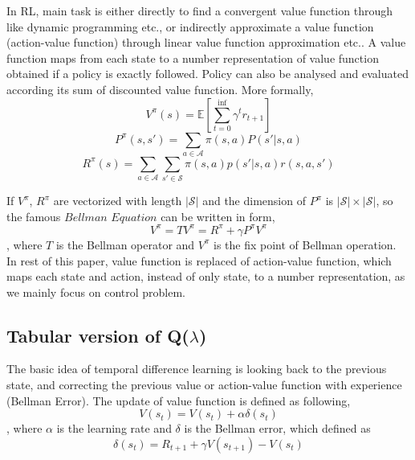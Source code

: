 \documentclass[conference]{IEEEtran}
\begin{document}
In RL, main task is either directly to find a convergent value function through like dynamic programming etc., or indirectly approximate a value function (action-value function) through linear value function approximation etc.. A value function maps from each state to a number representation of value function obtained if a policy is exactly followed. Policy can also be analysed and evaluated according its sum of discounted value function. More formally, 
\begin{equation}
V^{\pi}(s) = \mathbb{E}[\sum_{t=0}^{\inf}\gamma^{t}r_{t+1}]
\end{equation}
\begin{equation}
P^{\pi}(s, s') = \sum_{a\in\mathcal{A}}\pi(s, a)P(s'|s,a)
\end{equation}
\begin{equation}
R^{\pi}(s) = \sum_{a\in\mathcal{A}}\sum_{s'\in\mathcal{S}}\pi(s, a)p(s'|s, a)r(s, a, s')
\end{equation}

If $V^{\pi}$, $R^{\pi}$ are vectorized with length $|\mathcal{S}|$ and the dimension of $P^\pi$ is $|\mathcal{S}|\times|\mathcal{S}|$, so the famous $Bellman$ $Equation$ can be written in form,
\begin{equation}
V^\pi=TV^\pi=R^\pi + \gamma P^\pi V^\pi
\end{equation}
, where $T$ is the Bellman operator and $V^\pi$ is the fix point of Bellman operation.\\ 

In rest of this paper, value function is replaced of action-value function, which maps each state and action, instead of only state, to a number representation, as we mainly focus on control problem.

\subsection{Tabular version of Q($\lambda$)}
The basic idea of temporal difference learning is looking back to the previous state, and correcting the previous value or action-value function with experience (Bellman Error). The update of value function is defined as following,
\begin{equation}
  V(s_t) = V(s_t) + \alpha \delta(s_t)
\end{equation}
, where $\alpha$ is the learning rate and $\delta$ is the Bellman error, which defined as
\begin{equation}
  \delta(s_t) = R_{t+1} + \gamma V(s_{t+1}) - V(s_t)
\end{equation}
\end{document}
